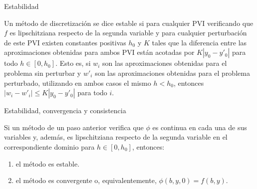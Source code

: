 		\begin{frame}{Estabilidad}
			\begin{definition}
				Un método de discretización se dice estable si para cualquier PVI verificando que $f$ es lipschitziana respecto de la segunda variable y para cualquier perturbación de este PVI existen constantes positivas $h_0$ y $K$ tales que la diferencia entre las aproximaciones obtenidas para ambos PVI están acotadas por $K |y_0 - y'_0|$ para todo $h \in [0,h_0]$. Esto es, si $w_i$ son las aproximaciones obtenidas para el problema sin perturbar y $w'_i$ son las aproximaciones obtenidas para el problema perturbado, utilizando en ambos casos el mismo $h < h_0$, entonces $\left|w_i - w'_i\right| \le K |y_0 - y'_0|$ para todo $i$.
			\end{definition}
		\end{frame}
		
		\begin{frame}{Estabilidad, convergencia y consistencia}
			\begin{theorem}
				Si un método de un paso anterior verifica que $\phi$ es continua en cada una de sus variables y, además, es lipschitziana respecto de la segunda variable en el correspondiente dominio para $h \in [0, h_0]$, entonces:
				
				\begin{enumerate}
					\item el método es estable.
					\item el método es convergente o, equivalentemente, $\phi(b,y,0) = f(b,y)$.
				\end{enumerate}
			\end{theorem}
		\end{frame}